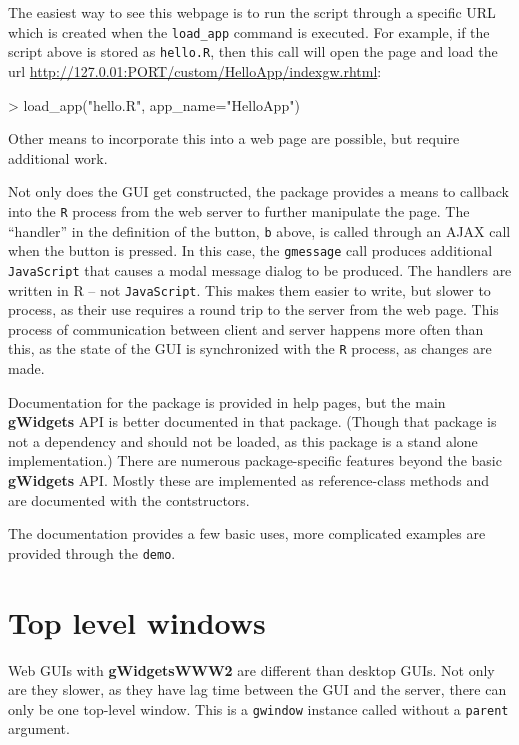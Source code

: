 \documentclass[12pt]{article}
\newcommand{\pkg}[1]{\textbf{#1}}
\newcommand{\code}[1]{\texttt{#1}}
\newcommand{\proglang}[1]{\code{#1}}
\newcommand{\R}{\proglang{R}}
\newcommand{\javascript}{\proglang{JavaScript}}
\begin{document}
The easiest way to see this webpage is to run the script through a
specific URL which is created when the \code{load\_app} command is
executed. For example, if the script above is stored as
\code{hello.R}, then this call will open the page and load the url
\url{http://127.0.01:PORT/custom/HelloApp/indexgw.rhtml}:

\begin{Schunk}
\begin{Sinput}
> load_app("hello.R", app_name="HelloApp")
\end{Sinput}
\end{Schunk}
Other means to incorporate this into a web page are possible, but
require additional work.

Not only does the GUI get constructed, the package provides a means
to callback into the \R\/ process from the web server to further
manipulate the page. The ``handler'' in the definition of the button,
\code{b} above, is called through an AJAX call when the button is
pressed. In this case, the \code{gmessage} call produces additional
\javascript{} that causes a modal message dialog to be produced. The
handlers are written in R -- not \javascript{}. This makes them easier to
write, but slower to process, as their use requires a round trip to
the server from the web page. This process of communication between
client and server happens more often than this, as the state of the
GUI is synchronized with the \R{} process, as changes are made.



Documentation for the package is provided in help pages, but the main
\pkg{gWidgets} API is better documented in that package. (Though that
package is not a dependency and should not be loaded, as this package
is a stand alone implementation.) There are numerous package-specific
features beyond the basic \pkg{gWidgets} API. Mostly these are
implemented as reference-class methods and are documented with the
contstructors.

The documentation provides a few basic uses, more complicated examples
are provided through the \code{demo}.

\section{Top level windows}

Web GUIs with \pkg{gWidgetsWWW2} are different than desktop GUIs. Not
only are they slower, as they have lag time between the GUI and the
server, there can only be one top-level window. This is a
\code{gwindow} instance called without a \code{parent} argument.
  
\end{document}
